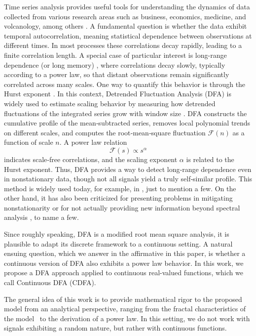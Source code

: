 \documentclass{amsart}
\begin{document}
Time series analysis provides useful tools for understanding the dynamics of data collected from various research areas such as business, economics, medicine, and volcanology, among others \cite{ser1, ser3, ser2}. A fundamental question is whether the data exhibit temporal autocorrelation, meaning statistical dependence between observations at different times. In most processes these correlations decay rapidly, leading to a finite correlation length. A special case of particular interest is long-range dependence (or long memory) \cite{Ber}, where correlations decay slowly, typically according to a power law, so that distant observations remain significantly correlated across many scales. One way to quantify this behavior is through the Hurst exponent \cite{Hurst, Wynn}. In this context, 
Detrended Fluctuation Analysis (DFA) is widely used to estimate scaling behavior by measuring how detrended fluctuations of the integrated series grow with window size \cite{Peng}. DFA constructs the cumulative profile of the mean‑subtracted series, removes local polynomial trends on different scales, and computes the root‑mean‑square fluctuation $\mathcal F(n)$ as a function of scale $n$. A power law relation 
\[ \mathcal{F}(s) \propto s^{\alpha} \] indicates scale‑free correlations, and the scaling exponent  $\alpha$
 is related to the Hurst exponent. Thus, DFA provides a way to detect long‑range dependence even in nonstationary data, though not all signals yield a truly self‑similar profile. This method is widely used today, for example, in \cite{Berna, dfa1, dfa2, ser3,Peng, Itz, Peng2}, just to mention a few. On the other hand, it has also been criticized for presenting problems in mitigating nonstationarity \cite{BrySpr} or for not actually providing new information beyond spectral analysis \cite{Heneghan2000}, to name a few.

Since roughly speaking, DFA is a modified root mean square analysis, it is plausible to adapt its discrete framework to a continuous setting. A natural ensuing question, which we answer in the affirmative in this paper, is whether a continuous version of DFA also exhibits a power law behavior. In this work, we propose a DFA approach applied to continuous real-valued functions, which we call Continuous DFA (CDFA). 

The general idea of this work is to provide mathematical rigor to the proposed model from an analytical perspective, ranging from the fractal characteristics of the model~\cite{Hut, Hut2} to the derivation of a power law. In this setting, we do not work with signals exhibiting a random nature, but rather with continuous functions. 
\end{document}
